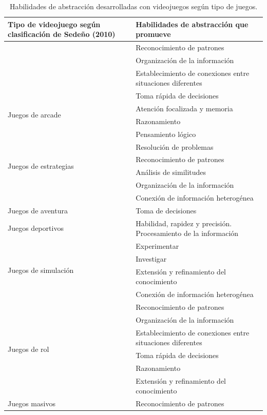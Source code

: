 \documentclass[spanish]{textolivre}
\begin{document}
\begin{table}[htbp]
\caption{Habilidades de abstracción desarrolladas con videojuegos según tipo de juegos.}
\label{tab1}
\centering
\begin{tabular}{p{}p{}}
\toprule
Tipo de videojuego según clasificación de Sedeño (2010) & Habilidades de abstracción que promueve \\ 
\midrule
\arrayrulecolor[gray]{.7}
\multirow{4}{=}{Juegos de acción} & Reconocimiento de patrones \\ 
 & Organización de la información \\ 
 & Establecimiento de conexiones entre situaciones diferentes\\
 & Toma rápida de decisiones \\ 
\midrule
\multirow{2}{=}{Juegos de arcade} & Atención focalizada y memoria \\ 
 & Razonamiento \\ 
\midrule
\multirow{6}{=}{Juegos de estrategias} & Pensamiento lógico\\
 & Resolución de problemas\\ 
 & Reconocimiento de patrones\\ 
 & Análisis de similitudes\\ 
 & Organización de la información\\ 
 & Conexión de información heterogénea \\ 
\midrule
Juegos de aventura & Toma de decisiones \\ 
\midrule
Juegos deportivos  & Habilidad, rapidez y precisión. Procesamiento de la información  \\ 
\midrule
\multirow{4}{=}{Juegos de simulación} & Experimentar\\ 
 & Investigar\\ 
 & Extensión y refinamiento del conocimiento\\
 & Conexión de información heterogénea \\ 
\midrule
\multirow{6}{=}{Juegos de rol} & Reconocimiento de patrones\\
 & Organización de la información\\ 
 & Establecimiento de conexiones entre situaciones diferentes\\
 & Toma rápida de decisiones\\ 
 & Razonamiento\\ 
 & Extensión y refinamiento del conocimiento \\ 
\midrule
\multirow{4}{=}{Juegos masivos} & Reconocimiento de  patrones\\ 

\end{tabular}
\end{table}
\end{document}
